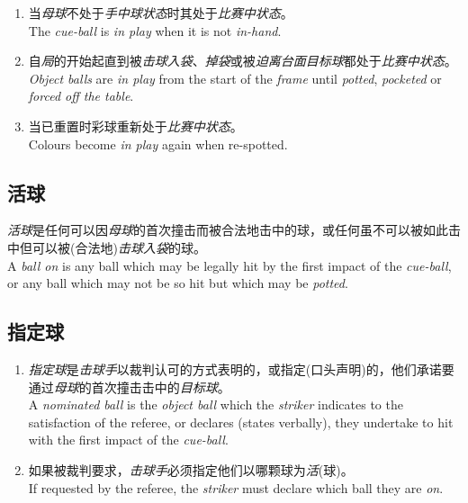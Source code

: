 \begin{enumerate}[label=(\alph*)]
    \item 当\emph{母球}不处于\emph{手中球状态}时其处于\emph{比赛中状态}。\\
    The \emph{cue-ball} is \emph{in play} when it is not \emph{in-hand}.
    \item 自\emph{局}的开始起直到被\emph{击球入袋}、\emph{掉袋}或被\emph{迫离台面}\emph{目标球}都处于\emph{比赛中状态}。\\
    \emph{Object balls} are \emph{in play} from the start of the \emph{frame} until \emph{potted}, \emph{pocketed} or \emph{forced off the table}.
    \item 当已重置时彩球重新处于\emph{比赛中状态}。\\
    Colours become \emph{in play} again when re-spotted.
\end{enumerate}

\subsection{活球}

\noindent \emph{活球}是任何可以因\emph{母球}的首次撞击而被合法地击中的球，或任何虽不可以被如此击中但可以被(合法地)\emph{击球入袋}的球。\\
A \emph{ball on} is any ball which may be legally hit by the first impact of the \emph{cue-ball}, or any ball which may not be so hit but which may be \emph{potted}.

\subsection{指定球}

\begin{enumerate}[label=(\alph*)]
    \item \emph{指定球}是\emph{击球手}以裁判认可的方式表明的，或指定(口头声明)的，他们承诺要通过\emph{母球}的首次撞击击中的\emph{目标球}。\\
    A \emph{nominated ball} is the \emph{object ball} which the \emph{striker} indicates to the satisfaction of the referee, or declares (states verbally), they undertake to hit with the first impact of the \emph{cue-ball}.
    \item 如果被裁判要求，\emph{击球手}必须指定他们以哪颗球为\emph{活}(球)。\\
    If requested by the referee, the \emph{striker} must declare which ball they are \emph{on}.
\end{enumerate}

